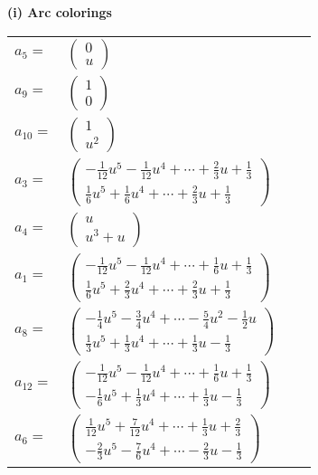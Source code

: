 \documentclass[1p]{elsarticle_modified}
\theoremstyle{definition}
\begin{document}
\flushleft \textbf{(i) Arc colorings}\\
\begin{tabular}{m{7pt} m{180pt} m{7pt} m{180pt} }
\flushright $a_{5}=$&$\begin{pmatrix}0\\u\end{pmatrix}$ \\
\flushright $a_{9}=$&$\begin{pmatrix}1\\0\end{pmatrix}$ \\
\flushright $a_{10}=$&$\begin{pmatrix}1\\u^2\end{pmatrix}$ \\
\flushright $a_{3}=$&$\begin{pmatrix}-\frac{1}{12} u^5-\frac{1}{12} u^4+\cdots+\frac{2}{3} u+\frac{1}{3}\\\frac{1}{6} u^5+\frac{1}{6} u^4+\cdots+\frac{2}{3} u+\frac{1}{3}\end{pmatrix}$ \\
\flushright $a_{4}=$&$\begin{pmatrix}u\\u^3+u\end{pmatrix}$ \\
\flushright $a_{1}=$&$\begin{pmatrix}-\frac{1}{12} u^5-\frac{1}{12} u^4+\cdots+\frac{1}{6} u+\frac{1}{3}\\\frac{1}{6} u^5+\frac{2}{3} u^4+\cdots+\frac{2}{3} u+\frac{1}{3}\end{pmatrix}$ \\
\flushright $a_{8}=$&$\begin{pmatrix}-\frac{1}{4} u^5-\frac{3}{4} u^4+\cdots-\frac{5}{4} u^2-\frac{1}{2} u\\\frac{1}{3} u^5+\frac{1}{3} u^4+\cdots+\frac{1}{3} u-\frac{1}{3}\end{pmatrix}$ \\
\flushright $a_{12}=$&$\begin{pmatrix}-\frac{1}{12} u^5-\frac{1}{12} u^4+\cdots+\frac{1}{6} u+\frac{1}{3}\\-\frac{1}{6} u^5+\frac{1}{3} u^4+\cdots+\frac{1}{3} u-\frac{1}{3}\end{pmatrix}$ \\
\flushright $a_{6}=$&$\begin{pmatrix}\frac{1}{12} u^5+\frac{7}{12} u^4+\cdots+\frac{1}{3} u+\frac{2}{3}\\-\frac{2}{3} u^5-\frac{7}{6} u^4+\cdots-\frac{2}{3} u-\frac{1}{3}\end{pmatrix}$ \\

\end{tabular}
\end{document}
